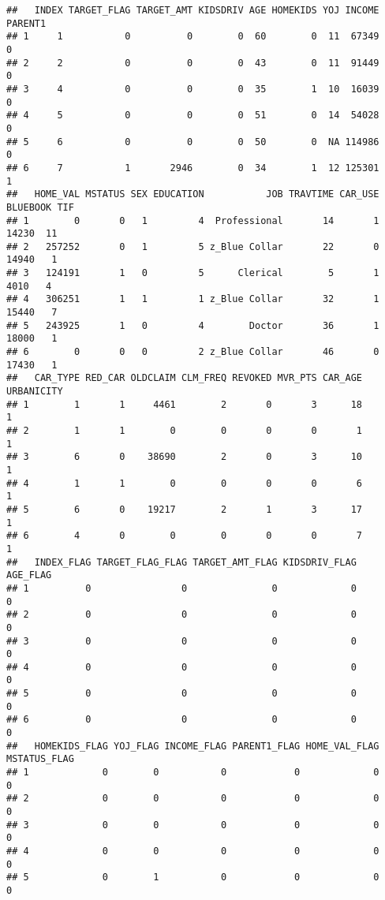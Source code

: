 \documentclass[
]{article}
\begin{document}
\begin{verbatim}
##   INDEX TARGET_FLAG TARGET_AMT KIDSDRIV AGE HOMEKIDS YOJ INCOME PARENT1
## 1     1           0          0        0  60        0  11  67349       0
## 2     2           0          0        0  43        0  11  91449       0
## 3     4           0          0        0  35        1  10  16039       0
## 4     5           0          0        0  51        0  14  54028       0
## 5     6           0          0        0  50        0  NA 114986       0
## 6     7           1       2946        0  34        1  12 125301       1
##   HOME_VAL MSTATUS SEX EDUCATION           JOB TRAVTIME CAR_USE BLUEBOOK TIF
## 1        0       0   1         4  Professional       14       1    14230  11
## 2   257252       0   1         5 z_Blue Collar       22       0    14940   1
## 3   124191       1   0         5      Clerical        5       1     4010   4
## 4   306251       1   1         1 z_Blue Collar       32       1    15440   7
## 5   243925       1   0         4        Doctor       36       1    18000   1
## 6        0       0   0         2 z_Blue Collar       46       0    17430   1
##   CAR_TYPE RED_CAR OLDCLAIM CLM_FREQ REVOKED MVR_PTS CAR_AGE URBANICITY
## 1        1       1     4461        2       0       3      18          1
## 2        1       1        0        0       0       0       1          1
## 3        6       0    38690        2       0       3      10          1
## 4        1       1        0        0       0       0       6          1
## 5        6       0    19217        2       1       3      17          1
## 6        4       0        0        0       0       0       7          1
##   INDEX_FLAG TARGET_FLAG_FLAG TARGET_AMT_FLAG KIDSDRIV_FLAG AGE_FLAG
## 1          0                0               0             0        0
## 2          0                0               0             0        0
## 3          0                0               0             0        0
## 4          0                0               0             0        0
## 5          0                0               0             0        0
## 6          0                0               0             0        0
##   HOMEKIDS_FLAG YOJ_FLAG INCOME_FLAG PARENT1_FLAG HOME_VAL_FLAG MSTATUS_FLAG
## 1             0        0           0            0             0            0
## 2             0        0           0            0             0            0
## 3             0        0           0            0             0            0
## 4             0        0           0            0             0            0
## 5             0        1           0            0             0            0

\end{verbatim}
\end{document}
